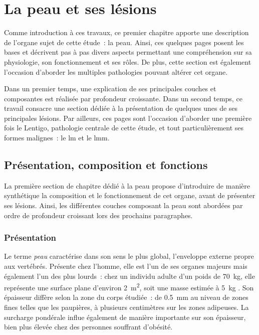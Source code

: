 \renewcommand{\thechapter}{\arabic{chapter}}
\setcounter{chapter}{0}

\chapter{La peau et ses lésions}
\label{chap:chapter_1}
\chapterintro
Comme introduction à ces travaux, ce premier chapitre apporte une description de l'organe sujet de cette étude~: la peau. Ainsi, ces quelques pages posent les bases et décrivent pas à pas divers aspects permettant une compréhension sur sa physiologie, son fonctionnement et ses rôles. De plus, cette section est également l'occasion d'aborder les multiples pathologies pouvant altérer cet organe.\par

Dans un premier temps, une explication de ses principales couches et composantes est réalisée par profondeur croissante. Dans un second temps, ce travail consacre une section dédiée à la présentation de quelques unes de ses principales lésions. Par ailleurs, ces pages sont l'occasion d'aborder une première fois le Lentigo, pathologie centrale de cette étude, et tout particulièrement ses formes malignes~: le \acrlong{lm} et le \acrlong{lmm}.\par
\newpage

\section{Présentation, composition et fonctions}
La première section de chapitre dédié à la peau propose d'introduire de manière synthétique la composition et le fonctionnement de cet organe, avant de présenter ses lésions. Ainsi, les différentes couches composant la peau sont abordées par ordre de profondeur croissant lors des prochains paragraphes.\par

\subsection{Présentation}
Le terme \textit{peau} caractérise dans son sens le plus global, l’enveloppe externe propre aux vertébrés. Présente chez l’homme, elle est l’un de ses organes majeurs mais également l’un des plus lourds~: chez un individu adulte d’un poids de \SI{70}{\kilo\gram}, elle représente une surface plane d’environ \SI{2}{\metre\squared}, soit une masse estimée à \SI{5}{\kilo\gram} \cite{McGrath2010}. Son épaisseur diffère selon la zone du corps étudiée~: de \SI{0,5}{\milli\metre} au niveau de zones fines telles que les paupières, à plusieurs centimètres sur les zones adipeuses. La surcharge pondérale influe également de manière importante sur son épaisseur, bien plus élevée chez des personnes souffrant d'obésité.\par


